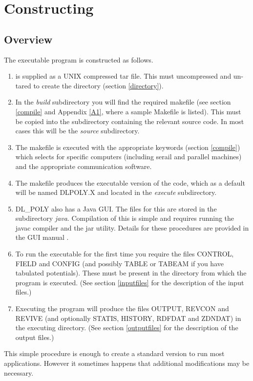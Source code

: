 
\section{Constructing \D{}}

\subsection{Overview}

The \D{} executable program is constructed as follows.

\begin{enumerate}
\item \D{} is supplied as a UNIX compressed tar file. This must uncompressed
and un-tared to create the \D{} directory (section \ref{directory}).
\item In the {\em build} subdirectory you will find the required \D{}
makefile (see section \ref{compile} and Appendix \ref{A1}, where a
sample Makefile is listed). This must
be copied into the subdirectory containing the relevant source
code. In most cases this will be the {\em source} subdirectory.
\item The makefile is executed with the appropriate keywords
(section \ref{compile}) which selects for specific computers (including
serail and parallel machines) and the appropriate communication software.  
\item The makefile produces the executable version of the code, which
as a default will be named DLPOLY.X and located in the {\em execute}
subdirectory.
\item DL\_POLY also has a Java GUI. The files for
this are stored in the subdirectory {\em java}. Compilation of this is
simple and requires running the javac compiler and the jar
utility. Details for these procedures are provided in the GUI manual
\cite{smith-gui}.
\item To run the executable for the first time you require the files CONTROL,
FIELD and CONFIG (and possibly TABLE or TABEAM if you have tabulated
potentials). These must be present in the directory from which the program
is executed. (See section \ref{inputfiles} for the description of the input
files.)
\item Executing the program will produce the files OUTPUT, REVCON and
REVIVE (and optionally STATIS, HISTORY, RDFDAT and ZDNDAT) in the
executing directory.  (See section \ref{outputfiles} for the
description of the output files.)
\end{enumerate}

This simple procedure is enough to create a standard version to run
most \D{} applications. However it sometimes happens that additional
modifications may be necessary. 

